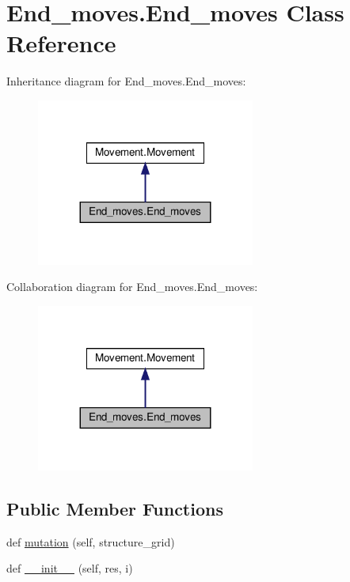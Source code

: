 \hypertarget{classEnd__moves_1_1End__moves}{}\section{End\+\_\+moves.\+End\+\_\+moves Class Reference}
\label{classEnd__moves_1_1End__moves}


Inheritance diagram for End\+\_\+moves.\+End\+\_\+moves\+:
\nopagebreak
\begin{figure}[H]
\begin{center}
\leavevmode
\includegraphics[width=203pt]{classEnd__moves_1_1End__moves__inherit__graph}
\end{center}
\end{figure}


Collaboration diagram for End\+\_\+moves.\+End\+\_\+moves\+:
\nopagebreak
\begin{figure}[H]
\begin{center}
\leavevmode
\includegraphics[width=203pt]{classEnd__moves_1_1End__moves__coll__graph}
\end{center}
\end{figure}
\subsection*{Public Member Functions}
\begin{DoxyCompactItemize}
\item 
def \hyperlink{classEnd__moves_1_1End__moves_a398d49afd0af75f9dd3306d66ab4f244}{mutation} (self, structure\+\_\+grid)
\item 
def \hyperlink{classEnd__moves_1_1End__moves_ae5788aa8e49a0569fc9c88cb3a74e722}{\+\_\+\+\_\+init\+\_\+\+\_\+} (self, res, i)
\end{DoxyCompactItemize}
